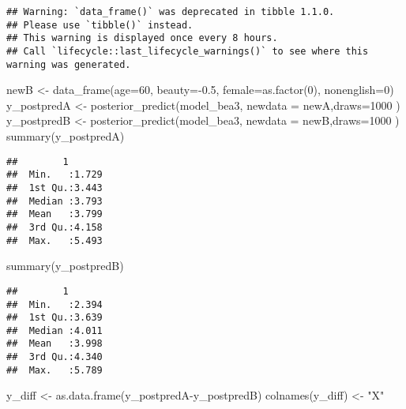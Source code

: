 \documentclass[
]{article}
\newenvironment{Shaded}{\begin{snugshade}}{\end{snugshade}}
\newcommand{\AttributeTok}[1]{\textcolor[rgb]{0.77,0.63,0.00}{#1}}
\newcommand{\DecValTok}[1]{\textcolor[rgb]{0.00,0.00,0.81}{#1}}
\newcommand{\FloatTok}[1]{\textcolor[rgb]{0.00,0.00,0.81}{#1}}
\newcommand{\FunctionTok}[1]{\textcolor[rgb]{0.00,0.00,0.00}{#1}}
\newcommand{\NormalTok}[1]{#1}
\newcommand{\OtherTok}[1]{\textcolor[rgb]{0.56,0.35,0.01}{#1}}
\newcommand{\SpecialCharTok}[1]{\textcolor[rgb]{0.00,0.00,0.00}{#1}}
\newcommand{\StringTok}[1]{\textcolor[rgb]{0.31,0.60,0.02}{#1}}
\begin{document}
\begin{verbatim}
## Warning: `data_frame()` was deprecated in tibble 1.1.0.
## Please use `tibble()` instead.
## This warning is displayed once every 8 hours.
## Call `lifecycle::last_lifecycle_warnings()` to see where this warning was generated.
\end{verbatim}

\begin{Shaded}
\begin{Highlighting}[]
\NormalTok{newB }\OtherTok{\textless{}{-}} \FunctionTok{data\_frame}\NormalTok{(}\AttributeTok{age=}\DecValTok{60}\NormalTok{, }\AttributeTok{beauty=}\SpecialCharTok{{-}}\FloatTok{0.5}\NormalTok{, }\AttributeTok{female=}\FunctionTok{as.factor}\NormalTok{(}\DecValTok{0}\NormalTok{), }\AttributeTok{nonenglish=}\DecValTok{0}\NormalTok{)}
\NormalTok{y\_postpredA }\OtherTok{\textless{}{-}} \FunctionTok{posterior\_predict}\NormalTok{(model\_bea3, }\AttributeTok{newdata =}\NormalTok{ newA,}\AttributeTok{draws=}\DecValTok{1000}\NormalTok{ )}
\NormalTok{y\_postpredB }\OtherTok{\textless{}{-}} \FunctionTok{posterior\_predict}\NormalTok{(model\_bea3, }\AttributeTok{newdata =}\NormalTok{ newB,}\AttributeTok{draws=}\DecValTok{1000}\NormalTok{ )}
\FunctionTok{summary}\NormalTok{(y\_postpredA)}
\end{Highlighting}
\end{Shaded}

\begin{verbatim}
##        1        
##  Min.   :1.729  
##  1st Qu.:3.443  
##  Median :3.793  
##  Mean   :3.799  
##  3rd Qu.:4.158  
##  Max.   :5.493
\end{verbatim}

\begin{Shaded}
\begin{Highlighting}[]
\FunctionTok{summary}\NormalTok{(y\_postpredB)}
\end{Highlighting}
\end{Shaded}

\begin{verbatim}
##        1        
##  Min.   :2.394  
##  1st Qu.:3.639  
##  Median :4.011  
##  Mean   :3.998  
##  3rd Qu.:4.340  
##  Max.   :5.789
\end{verbatim}

\begin{Shaded}
\begin{Highlighting}[]
\NormalTok{y\_diff }\OtherTok{\textless{}{-}} \FunctionTok{as.data.frame}\NormalTok{(y\_postpredA}\SpecialCharTok{{-}}\NormalTok{y\_postpredB)}
\FunctionTok{colnames}\NormalTok{(y\_diff) }\OtherTok{\textless{}{-}} \StringTok{"X"}
\end{Highlighting}
\end{Shaded}
\end{document}

